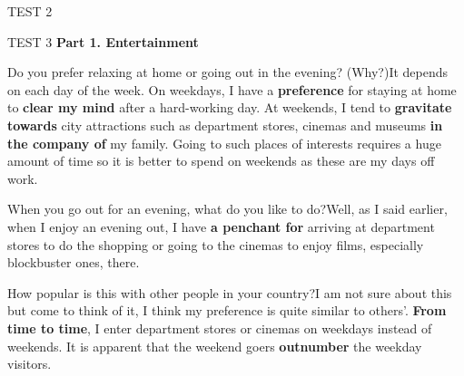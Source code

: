 \begin{glossarymc}[Cambridge 5]
\begin{test}{TEST 2}
\begin{VocabHighlights}
    \end{VocabHighlights}

    \end{test}

    \begin{test}{TEST 3}
    \noindent
    \textbf{Part 1. Entertainment}
    \begin{qa}{Do you prefer relaxing at home or going out in the evening? (Why?)}{It depends on each day of the week. On weekdays, I have a \textbf{preference} for staying at home to \textbf{clear my mind} after a hard-working day. At weekends, I tend to \textbf{gravitate towards} city attractions such as department stores, cinemas and museums \textbf{in the company of} my family. Going to such places of interests requires a huge amount of time so it is better to spend on weekends as these are my days off work.}
    \end{qa}

    \begin{qa}{When you go out for an evening, what do you like to do?}{Well, as I said earlier, when I enjoy an evening out, I have \textbf{a penchant for} arriving at department stores to do the shopping or going to the cinemas to enjoy films, especially blockbuster ones, there.}
    \end{qa}

    \begin{qa}{How popular is this with other people in your country?}{I am not sure about this but come to think of it, I think my preference is quite similar to others'. \textbf{From time to time}, I enter department stores or cinemas on weekdays instead of weekends. It is apparent that the weekend goers \textbf{outnumber} the weekday visitors.}
    \end{qa}


\end{test}
\end{glossarymc}
